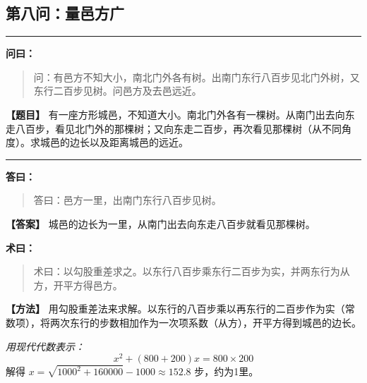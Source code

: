 \documentclass[11pt,a4paper]{article}
\newenvironment{mathproblem}[1][]{%
  \medskip\noindent\rule{\textwidth}{0.4pt}%
  \par\noindent{\Large\bfseries\color{sectioncolor}#1}\par\nopagebreak%
  \smallskip%
}{%
  \par\noindent\rule{\textwidth}{0.4pt}\medskip%
}
\newcommand{\wenlabel}{\textbf{\color{origcolor}问曰：}}
\newcommand{\dalabel}{\textbf{\color{origcolor}答曰：}}
\newcommand{\shulabel}{\textbf{\color{origcolor}术曰：}}
\newcommand{\modwenlabel}{\textbf{\color{modcolor}【题目】}}
\newcommand{\moddalabel}{\textbf{\color{modcolor}【答案】}}
\newcommand{\modshulabel}{\textbf{\color{modcolor}【方法】}}
\begin{document}
\subsection*{第八问：量邑方广}

\begin{mathproblem}[\textbf{第八问：量邑方广}]

\begin{originaltext}
\wenlabel
\begin{quote}
\textcolor{origcolor}{%
问：有邑方不知大小，南北门外各有树。出南门东行八百步见北门外树，又东行二百步见树。问邑方及去邑远近。
}
\end{quote}
\end{originaltext}

\begin{moderntext}
\modwenlabel
有一座方形城邑，不知道大小。南北门外各有一棵树。从南门出去向东走八百步，看见北门外的那棵树；又向东走二百步，再次看见那棵树（从不同角度）。求城邑的边长以及距离城邑的远近。
\end{moderntext}

\end{mathproblem}

\begin{originaltext}
\dalabel
\begin{quote}
\textcolor{origcolor}{%
答曰：邑方一里，出南门东行八百步见树。
}
\end{quote}
\end{originaltext}

\begin{moderntext}
\moddalabel
城邑的边长为一里，从南门出去向东走八百步就看见那棵树。
\end{moderntext}

\begin{originaltext}
\shulabel
\begin{quote}
\textcolor{origcolor}{%
术曰：以勾股重差求之。以东行八百步乘东行二百步为实，并两东行为从方，开平方得邑方。
}
\end{quote}
\end{originaltext}

\begin{moderntext}
\modshulabel
用勾股重差法来求解。以东行的八百步乘以再东行的二百步作为实（常数项），将两次东行的步数相加作为一次项系数（从方），开平方得到城邑的边长。

\textit{用现代代数表示：}
\[
x^2 + (800 + 200)x = 800 \times 200
\]
解得 $x = \sqrt{1000^2 + 160000} - 1000 \approx 152.8$ 步，约为1里。
\end{moderntext}
\end{document}
